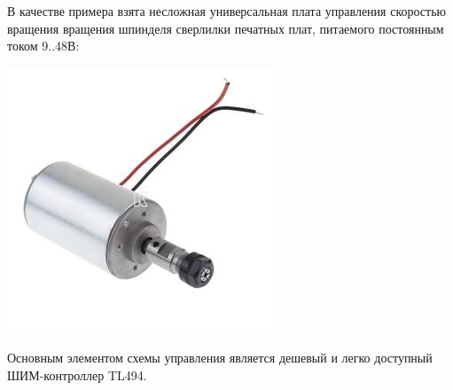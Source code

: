 В качестве примера взята несложная универсальная плата управления
скоростью вращения вращения шпинделя сверлилки печатных плат,
питаемого постоянным током 9..48В:

\includegraphics{SpindleDriver/spindle.jpeg}

Основным элементом схемы управления является дешевый и легко
доступный ШИМ-контроллер TL494.

